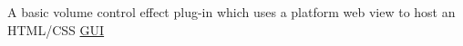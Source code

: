A basic volume control effect plug-\/in which uses a platform web view to host an H\+T\+M\+L/\+C\+SS \mbox{\hyperlink{class_g_u_i}{G\+UI}} 